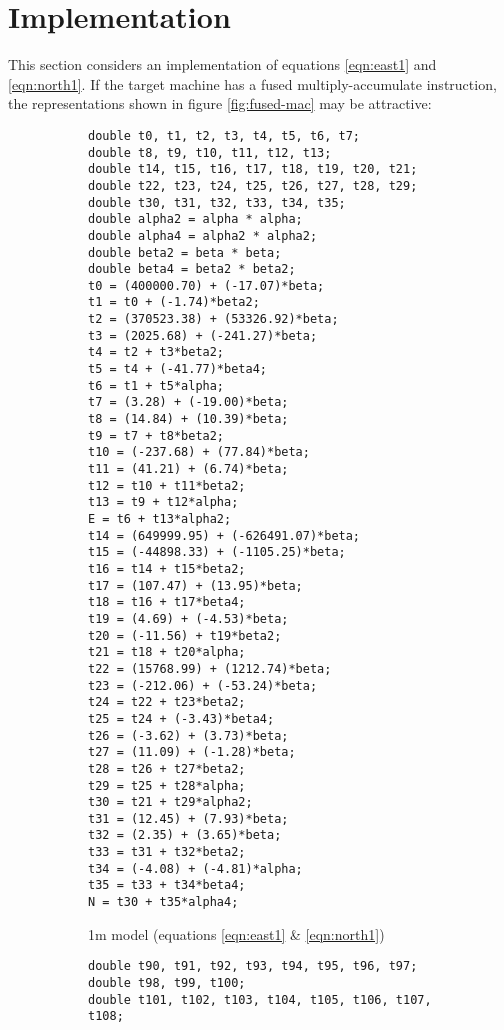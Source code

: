 \documentclass[10pt,a4paper]{article}
\begin{document}
\section {Implementation}
\label{sec:implementation}
This section considers an implementation of equations \eqref{eqn:east1} and
\eqref{eqn:north1}.  If the target machine has a fused multiply-accumulate
instruction, the representations shown in figure \ref{fig:fused-mac} may be
attractive:

\begin{figure}[htb]

  \hrulefill

  \begin{subfigure}[b]{0.45\textwidth}
\footnotesize
\begin{verbatim}
double t0, t1, t2, t3, t4, t5, t6, t7;
double t8, t9, t10, t11, t12, t13;
double t14, t15, t16, t17, t18, t19, t20, t21;
double t22, t23, t24, t25, t26, t27, t28, t29;
double t30, t31, t32, t33, t34, t35;
double alpha2 = alpha * alpha;
double alpha4 = alpha2 * alpha2;
double beta2 = beta * beta;
double beta4 = beta2 * beta2;
t0 = (400000.70) + (-17.07)*beta;
t1 = t0 + (-1.74)*beta2;
t2 = (370523.38) + (53326.92)*beta;
t3 = (2025.68) + (-241.27)*beta;
t4 = t2 + t3*beta2;
t5 = t4 + (-41.77)*beta4;
t6 = t1 + t5*alpha;
t7 = (3.28) + (-19.00)*beta;
t8 = (14.84) + (10.39)*beta;
t9 = t7 + t8*beta2;
t10 = (-237.68) + (77.84)*beta;
t11 = (41.21) + (6.74)*beta;
t12 = t10 + t11*beta2;
t13 = t9 + t12*alpha;
E = t6 + t13*alpha2;
t14 = (649999.95) + (-626491.07)*beta;
t15 = (-44898.33) + (-1105.25)*beta;
t16 = t14 + t15*beta2;
t17 = (107.47) + (13.95)*beta;
t18 = t16 + t17*beta4;
t19 = (4.69) + (-4.53)*beta;
t20 = (-11.56) + t19*beta2;
t21 = t18 + t20*alpha;
t22 = (15768.99) + (1212.74)*beta;
t23 = (-212.06) + (-53.24)*beta;
t24 = t22 + t23*beta2;
t25 = t24 + (-3.43)*beta4;
t26 = (-3.62) + (3.73)*beta;
t27 = (11.09) + (-1.28)*beta;
t28 = t26 + t27*beta2;
t29 = t25 + t28*alpha;
t30 = t21 + t29*alpha2;
t31 = (12.45) + (7.93)*beta;
t32 = (2.35) + (3.65)*beta;
t33 = t31 + t32*beta2;
t34 = (-4.08) + (-4.81)*alpha;
t35 = t33 + t34*beta4;
N = t30 + t35*alpha4;
\end{verbatim}
\caption{1m model (equations \eqref{eqn:east1} \& \eqref{eqn:north1})}
\end{subfigure}
  \begin{subfigure}[b]{0.45\textwidth}
    \footnotesize
    \begin{verbatim}
double t90, t91, t92, t93, t94, t95, t96, t97;
double t98, t99, t100;
double t101, t102, t103, t104, t105, t106, t107, t108;

\end{verbatim}
\end{subfigure}
\end{figure}
\end{document}

